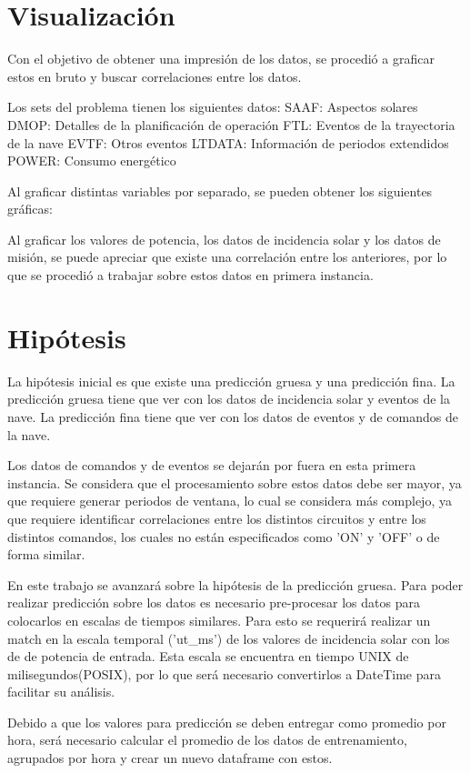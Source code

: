 \documentclass[../Main.tex]{subfiles}
\begin{document}
\section{Visualización}
Con el objetivo de obtener una impresión de los datos, se procedió a graficar estos en bruto y buscar correlaciones entre los datos. 

Los sets del problema tienen los siguientes datos:
SAAF: Aspectos solares
DMOP: Detalles de la planificación de operación
FTL: Eventos de la trayectoria de la nave
EVTF: Otros eventos
LTDATA: Información de periodos extendidos
POWER: Consumo energético

Al graficar distintas variables por separado, se pueden obtener los siguientes gráficas:

Al graficar los valores de potencia, los datos de incidencia solar y los datos de misión, se puede apreciar que existe una correlación entre los anteriores, por lo que se procedió a trabajar sobre estos datos en primera instancia. 

\section{Hipótesis}
La hipótesis inicial es que existe una predicción gruesa y una predicción fina. La predicción gruesa tiene que ver con los datos de incidencia solar y eventos de la nave. La predicción fina tiene que ver con los datos de eventos y de comandos de la nave.

Los datos de comandos y de eventos se dejarán por fuera en esta primera instancia. Se considera que el procesamiento sobre estos datos debe ser mayor, ya que requiere generar periodos de ventana, lo cual se considera más complejo, ya que requiere identificar correlaciones entre los distintos circuitos y entre los distintos comandos, los cuales no están especificados como 'ON' y 'OFF' o de forma similar.

En este trabajo se avanzará sobre la hipótesis de la predicción gruesa. Para poder realizar predicción sobre los datos es necesario pre-procesar los datos para colocarlos en escalas de tiempos similares. Para esto se requerirá realizar un match en la escala temporal ('ut_ms') de los valores de incidencia solar con los de de potencia de entrada. Esta escala se encuentra en tiempo UNIX de milisegundos(POSIX), por lo que será necesario convertirlos a DateTime para facilitar su análisis.

Debido a que los valores para predicción se deben entregar como promedio por hora, será necesario calcular el promedio de los datos de entrenamiento, agrupados por hora y crear un nuevo dataframe con estos.
\end{document}
